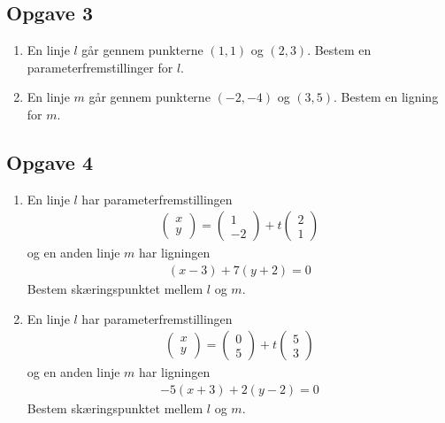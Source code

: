 \subsection*{Opgave 3}
\begin{enumerate}[label=\roman*)]
	\item En linje $l$ går gennem punkterne $(1,1)$ og $(2,3)$. Bestem en parameterfremstillinger for 
	$l$. 
	\item En linje $m$ går gennem punkterne $(-2,-4)$ og $(3,5)$. Bestem en ligning for $m$. 
\end{enumerate}

\subsection*{Opgave 4}
\begin{enumerate}[label=\roman*)]
	\item En linje $l$ har parameterfremstillingen 
	\begin{align*}
		\begin{pmatrix}
			x \\ y
		\end{pmatrix} = 
		\begin{pmatrix}
			1 \\ -2
		\end{pmatrix} + t
		\begin{pmatrix}
			2 \\ 1
		\end{pmatrix}
	\end{align*}
	og en anden linje $m$ har ligningen
	\begin{align*}
		(x-3) + 7(y+2) = 0
	\end{align*}
	Bestem skæringspunktet mellem $l$ og $m$. 
	\item En linje $l$ har parameterfremstillingen 
	\begin{align*}
		\begin{pmatrix}
			x \\ y
		\end{pmatrix} = 
		\begin{pmatrix}
			0 \\ 5
		\end{pmatrix} + t
		\begin{pmatrix}
			5 \\ 3
		\end{pmatrix}
	\end{align*}
	og en anden linje $m$ har ligningen
	\begin{align*}
		-5(x+3) + 2(y-2) = 0
	\end{align*}
	Bestem skæringspunktet mellem $l$ og $m$. 
\end{enumerate}
